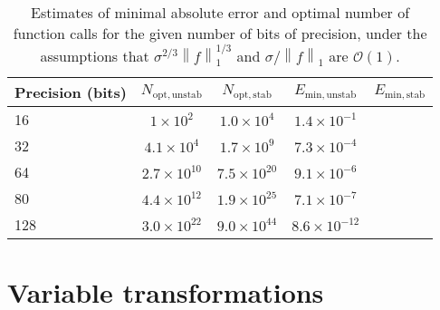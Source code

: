 \documentclass{ansarticle}
\begin{document}
\begin{table}
  \begin{center}
    \begin{tabular}{lcccc}
      \toprule
   Precision (bits)  & $N_{\mathrm{opt, unstab}}$ &  $N_{\mathrm{opt, stab}}$ & $E_{\mathrm{min, unstab}}$ & $E_{\mathrm{min, stab}}$  \\
      \hline
      16 & $1\times 10^{2}$                                                     &  $1.0 \times 10^4$                              & $1.4\times 10^{-1}$  & \\
      32 & $4.1\times 10^{4}$                                                 &  $1.7\times 10^{9}$                              & $7.3\times 10^{-4}$   & \\
      64 & $2.7\times 10^{10}$                               &  $7.5 \times 10^{20}$                             &  $9.1\times 10^{-6}$ & \\
      80 & $4.4\times 10^{12}$                               &  $1.9\times 10^{25}$                              & $7.1\times 10^{-7}$   & \\
      128 & $3.0\times 10^{22}$                             &  $9.0\times 10^{44}$                             & $8.6\times 10^{-12}$  & \\
      \bottomrule
    \end{tabular}
  \end{center}
    \caption{Estimates of minimal absolute error and optimal number of function calls for the given number of bits of precision, under the assumptions that $\sigma^{2/3}\left\|f\right\|_{1}^{1/3}$ and $\sigma/\left\|f\right\|_1$ are $\mathcal{O}(1)$.}
    \label{tab:errorestimates}
\end{table}


\section{Variable transformations}
\end{document}
